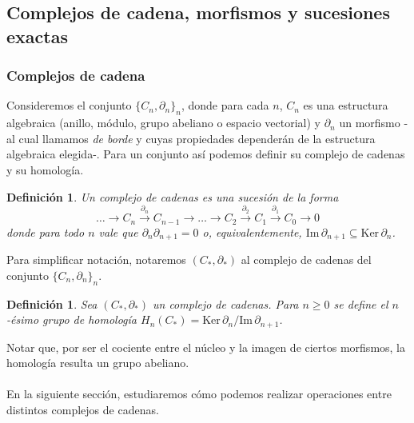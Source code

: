 \documentclass[12pt,a4paper]{article}
\newtheorem{definition}[theorem]{Definición}
\begin{document}
\subsection{Complejos de cadena, morfismos y sucesiones exactas}
\subsubsection{Complejos de cadena}
Consideremos el conjunto $\{C_n, \partial_n\}_n$, donde para cada $n$, $C_n$ es una estructura algebraica (anillo, módulo, grupo abeliano o espacio vectorial) y $\partial_n$ un morfismo -al cual llamamos \textit{de borde} y cuyas propiedades dependerán de la estructura algebraica elegida-. Para un conjunto así podemos definir su complejo de cadenas y su homología.
\begin{definition}
    Un complejo de cadenas es una sucesión de la forma
    \[
        \ldots \rightarrow C_n \xrightarrow{\partial_n} C_{n-1} \rightarrow \ldots \rightarrow C_2\xrightarrow{\partial_2} C_1\xrightarrow{\partial_1} C_0 \rightarrow 0
    \]
    donde para todo $n$ vale que $\partial_n\partial_{n+1}=0$ o, equivalentemente, $\mathrm{Im} \, \partial_{n+1} \subseteq \mathrm{Ker} \, \partial_n$.
\end{definition}
Para simplificar notación, notaremos $(C_*, \partial_*)$ al complejo de cadenas del conjunto $\{C_n, \partial_n\}_n$.
\begin{definition}
Sea $(C_*,\partial_*)$ un complejo de cadenas. Para $n \geq 0$ se define el $n$-ésimo grupo de homología $H_n(C_*) = \mathrm{Ker} \, \partial_n /  \mathrm{Im} \, \partial_{n+1}$.
\end{definition}
Notar que, por ser el cociente entre el núcleo y la imagen de ciertos morfismos, la homología resulta un grupo abeliano.
\\
\\
En la siguiente sección, estudiaremos cómo podemos realizar operaciones entre distintos complejos de cadenas.
\end{document}
